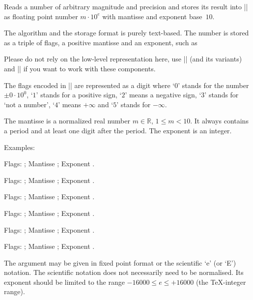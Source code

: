 \begin{command}{\pgfmathfloatparsenumber{}}
	Reads a number of arbitrary magnitude and precision and stores its result into |\pgfmathresult| as floating point number $m \cdot 10^e$ with mantisse and exponent base~$10$.

	The algorithm and the storage format is purely text-based. The number is stored as a triple of flags, a positive mantisse and an exponent, such as
\begin{codeexample}[]
\pgfmathresult
\end{codeexample}
	Please do not rely on the low-level representation here, use |\pgfmathfloattomacro| (and its variants) and |\pgfmathfloatcreate| if you want to work with these components.

	The flags encoded in |\pgfmathresult| are represented as a digit where `$0$' stands for the number $\pm 0\cdot 10^0$, `$1$' stands for a positive sign, `$2$' means a negative sign, `$3$' stands for `not a number', `$4$' means $+\infty$ and `$5$' stands for $-\infty$.

	The mantisse is a normalized real number $m \in \mathbb{R}$, $1 \le m < 10$. It always contains a period and at least one digit after the period. The exponent is an integer.

	Examples:
\begin{codeexample}[]
\pgfmathfloattomacro{\pgfmathresult}{\F}{\M}{\E}
Flags: \F; Mantisse \M; Exponent \E.
\end{codeexample}

\begin{codeexample}[]
\pgfmathfloattomacro{\pgfmathresult}{\F}{\M}{\E}
Flags: \F; Mantisse \M; Exponent \E.
\end{codeexample}

\begin{codeexample}[]
\pgfmathfloattomacro{\pgfmathresult}{\F}{\M}{\E}
Flags: \F; Mantisse \M; Exponent \E.
\end{codeexample}

\begin{codeexample}[]
\pgfmathfloattomacro{\pgfmathresult}{\F}{\M}{\E}
Flags: \F; Mantisse \M; Exponent \E.
\end{codeexample}

\begin{codeexample}[]
\pgfmathfloattomacro{\pgfmathresult}{\F}{\M}{\E}
Flags: \F; Mantisse \M; Exponent \E.
\end{codeexample}

\begin{codeexample}[]
\pgfmathfloattomacro{\pgfmathresult}{\F}{\M}{\E}
Flags: \F; Mantisse \M; Exponent \E.
\end{codeexample}
	The argument  may be given in fixed point format or the scientific `e' (or `E') notation. The scientific notation does not necessarily need to be normalised. Its exponent should be limited to the range $-16000 \le e \le +16000$ (the \TeX-integer range).
\end{command}

